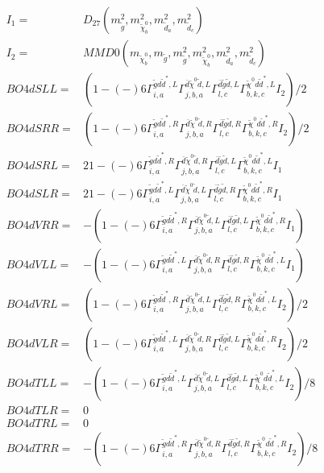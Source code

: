 \documentclass[A4,landscape]{article}
\begin{document}
\begin{align} 
I_1 = & D_{27}(m^2_{\tilde{g}}, m^2_{\tilde{\chi}^0_{{b}}}, m^2_{\tilde{d}_{{a}}}, m^2_{\tilde{d}_{{c}}}) \\ 
I_2 = & MMD0(m_{\tilde{\chi}^0_{{b}}}, m_{\tilde{g}}, m^2_{\tilde{g}}, m^2_{\tilde{\chi}^0_{{b}}}, m^2_{\tilde{d}_{{a}}}, m^2_{\tilde{d}_{{c}}}) \\ 
  BO4dSLL= & (  1
-(-)
  6 \Gamma^{\tilde{g} d \tilde{d}^*,L}_{i, a} \Gamma^{\bar{d}\tilde{\chi}^0 \tilde{d} ,L}_{j, b, a} \Gamma^{\bar{d}\tilde{g} \tilde{d} ,L}_{l, c} \Gamma^{\tilde{\chi}^0 d \tilde{d}^*,L}_{b, k, c} I_2)/2 \\ 
  BO4dSRR= & (  1
-(-)
  6 \Gamma^{\tilde{g} d \tilde{d}^*,R}_{i, a} \Gamma^{\bar{d}\tilde{\chi}^0 \tilde{d} ,R}_{j, b, a} \Gamma^{\bar{d}\tilde{g} \tilde{d} ,R}_{l, c} \Gamma^{\tilde{\chi}^0 d \tilde{d}^*,R}_{b, k, c} I_2)/2 \\ 
  BO4dSRL= & 2   1
-(-)
  6 \Gamma^{\tilde{g} d \tilde{d}^*,R}_{i, a} \Gamma^{\bar{d}\tilde{\chi}^0 \tilde{d} ,R}_{j, b, a} \Gamma^{\bar{d}\tilde{g} \tilde{d} ,L}_{l, c} \Gamma^{\tilde{\chi}^0 d \tilde{d}^*,L}_{b, k, c} I_1 \\ 
  BO4dSLR= & 2   1
-(-)
  6 \Gamma^{\tilde{g} d \tilde{d}^*,L}_{i, a} \Gamma^{\bar{d}\tilde{\chi}^0 \tilde{d} ,L}_{j, b, a} \Gamma^{\bar{d}\tilde{g} \tilde{d} ,R}_{l, c} \Gamma^{\tilde{\chi}^0 d \tilde{d}^*,R}_{b, k, c} I_1 \\ 
  BO4dVRR= & -(  1
-(-)
  6 \Gamma^{\tilde{g} d \tilde{d}^*,R}_{i, a} \Gamma^{\bar{d}\tilde{\chi}^0 \tilde{d} ,L}_{j, b, a} \Gamma^{\bar{d}\tilde{g} \tilde{d} ,L}_{l, c} \Gamma^{\tilde{\chi}^0 d \tilde{d}^*,R}_{b, k, c} I_1) \\ 
  BO4dVLL= & -(  1
-(-)
  6 \Gamma^{\tilde{g} d \tilde{d}^*,L}_{i, a} \Gamma^{\bar{d}\tilde{\chi}^0 \tilde{d} ,R}_{j, b, a} \Gamma^{\bar{d}\tilde{g} \tilde{d} ,R}_{l, c} \Gamma^{\tilde{\chi}^0 d \tilde{d}^*,L}_{b, k, c} I_1) \\ 
  BO4dVRL= & (  1
-(-)
  6 \Gamma^{\tilde{g} d \tilde{d}^*,R}_{i, a} \Gamma^{\bar{d}\tilde{\chi}^0 \tilde{d} ,L}_{j, b, a} \Gamma^{\bar{d}\tilde{g} \tilde{d} ,R}_{l, c} \Gamma^{\tilde{\chi}^0 d \tilde{d}^*,L}_{b, k, c} I_2)/2 \\ 
  BO4dVLR= & (  1
-(-)
  6 \Gamma^{\tilde{g} d \tilde{d}^*,L}_{i, a} \Gamma^{\bar{d}\tilde{\chi}^0 \tilde{d} ,R}_{j, b, a} \Gamma^{\bar{d}\tilde{g} \tilde{d} ,L}_{l, c} \Gamma^{\tilde{\chi}^0 d \tilde{d}^*,R}_{b, k, c} I_2)/2 \\ 
  BO4dTLL= & -(  1
-(-)
  6 \Gamma^{\tilde{g} d \tilde{d}^*,L}_{i, a} \Gamma^{\bar{d}\tilde{\chi}^0 \tilde{d} ,L}_{j, b, a} \Gamma^{\bar{d}\tilde{g} \tilde{d} ,L}_{l, c} \Gamma^{\tilde{\chi}^0 d \tilde{d}^*,L}_{b, k, c} I_2)/8 \\ 
  BO4dTLR= & 0 \\ 
  BO4dTRL= & 0 \\ 
  BO4dTRR= & -(  1
-(-)
  6 \Gamma^{\tilde{g} d \tilde{d}^*,R}_{i, a} \Gamma^{\bar{d}\tilde{\chi}^0 \tilde{d} ,R}_{j, b, a} \Gamma^{\bar{d}\tilde{g} \tilde{d} ,R}_{l, c} \Gamma^{\tilde{\chi}^0 d \tilde{d}^*,R}_{b, k, c} I_2)/8 \\ 
\end{align} 
\end{document}
